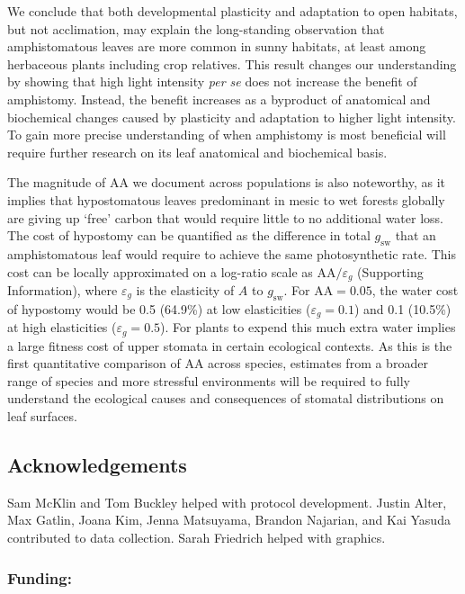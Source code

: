 \documentclass[
  letterpaper,
  DIV=11,
  numbers=noendperiod]{scrartcl}
\newcommand{\aax}{$\mathrm{AA}$}
\newcommand{\gsw}{$g_\text{sw}$}
\begin{document}
We conclude that both developmental plasticity and adaptation to open
habitats, but not acclimation, may explain the long-standing observation
that amphistomatous leaves are more common in sunny habitats, at least
among herbaceous plants including crop relatives. This result changes
our understanding by showing that high light intensity \emph{per se}
does not increase the benefit of amphistomy. Instead, the benefit
increases as a byproduct of anatomical and biochemical changes caused by
plasticity and adaptation to higher light intensity. To gain more
precise understanding of when amphistomy is most beneficial will require
further research on its leaf anatomical and biochemical basis.

The magnitude of \aax{} we document across populations is also
noteworthy, as it implies that hypostomatous leaves predominant in mesic
to wet forests globally are giving up `free' carbon that would require
little to no additional water loss. The cost of hypostomy can be
quantified as the difference in total \gsw{} that an amphistomatous leaf
would require to achieve the same photosynthetic rate. This cost can be
locally approximated on a log-ratio scale as
\(\mathrm{AA} / \varepsilon_g\) (Supporting Information), where
\(\varepsilon_g\) is the elasticity of \(A\) to \gsw. For
\(\mathrm{AA} = 0.05\), the water cost of hypostomy would be 0.5
(64.9\%) at low elasticities (\(\varepsilon_g = 0.1\)) and 0.1 (10.5\%)
at high elasticities (\(\varepsilon_g = 0.5\)). For plants to expend
this much extra water implies a large fitness cost of upper stomata in
certain ecological contexts. As this is the first quantitative
comparison of \aax{} across species, estimates from a broader range of
species and more stressful environments will be required to fully
understand the ecological causes and consequences of stomatal
distributions on leaf surfaces.

\subsection{Acknowledgements}\label{acknowledgements}

Sam McKlin and Tom Buckley helped with protocol development. Justin
Alter, Max Gatlin, Joana Kim, Jenna Matsuyama, Brandon Najarian, and Kai
Yasuda contributed to data collection. Sarah Friedrich helped with
graphics.

\subsubsection{Funding:}\label{funding}
\end{document}
